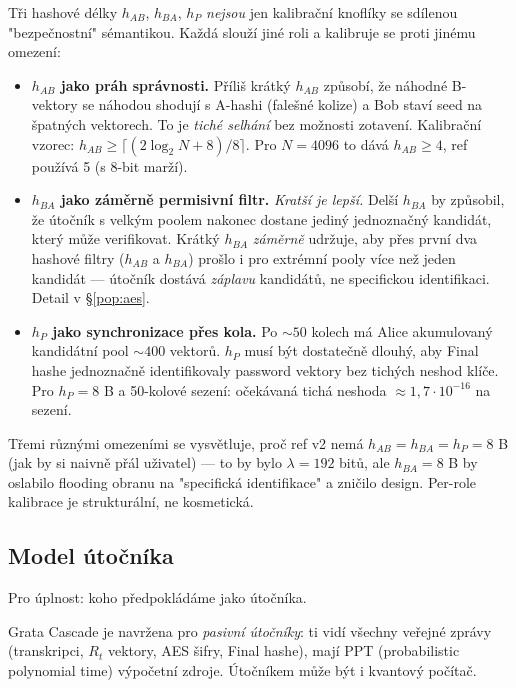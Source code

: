 \documentclass[11pt,a4paper]{article}
\begin{document}
Tři hashové délky $h_{AB}$, $h_{BA}$, $h_P$ \emph{nejsou} jen kalibrační knoflíky se sdílenou "bezpečnostní" sémantikou. Každá slouží jiné roli a kalibruje se proti jinému omezení:

\begin{itemize}[leftmargin=*]
\item \textbf{$h_{AB}$ jako práh správnosti.} Příliš krátký $h_{AB}$ způsobí, že náhodné B-vektory se náhodou shodují s A-hashi (falešné kolize) a Bob staví seed na špatných vektorech. To je \emph{tiché selhání} bez možnosti zotavení. Kalibrační vzorec: $h_{AB} \geq \lceil (2 \log_2 N + 8)/8 \rceil$. Pro $N = 4096$ to dává $h_{AB} \geq 4$, ref používá 5 (s 8-bit marží).

\item \textbf{$h_{BA}$ jako záměrně permisivní filtr.} \emph{Kratší je lepší.} Delší $h_{BA}$ by způsobil, že útočník s velkým poolem nakonec dostane jediný jednoznačný kandidát, který může verifikovat. Krátký $h_{BA}$ \emph{záměrně} udržuje, aby přes první dva hashové filtry ($h_{AB}$ a $h_{BA}$) prošlo i pro extrémní pooly více než jeden kandidát --- útočník dostává \emph{záplavu} kandidátů, ne specifickou identifikaci. Detail v §\ref{pop:aes}.

\item \textbf{$h_P$ jako synchronizace přes kola.} Po $\sim 50$ kolech má Alice akumulovaný kandidátní pool $\sim 400$ vektorů. $h_P$ musí být dostatečně dlouhý, aby Final hashe jednoznačně identifikovaly password vektory bez tichých neshod klíče. Pro $h_P = 8$ B a 50-kolové sezení: očekávaná tichá neshoda $\approx 1{,}7 \cdot 10^{-16}$ na sezení.
\end{itemize}

Třemi různými omezeními se vysvětluje, proč ref v2 nemá $h_{AB} = h_{BA} = h_P = 8$ B (jak by si naivně přál uživatel) --- to by bylo $\lambda = 192$ bitů, ale $h_{BA} = 8$ B by oslabilo flooding obranu na "specifická identifikace" a zničilo design. Per-role kalibrace je strukturální, ne kosmetická.

\subsection{Model útočníka}

Pro úplnost: koho předpokládáme jako útočníka.

Grata Cascade je navržena pro \emph{pasivní útočníky}: ti vidí všechny veřejné zprávy (transkripci, $R_t$ vektory, AES šifry, Final hashe), mají PPT (probabilistic polynomial time) výpočetní zdroje. Útočníkem může být i kvantový počítač.
\end{document}
